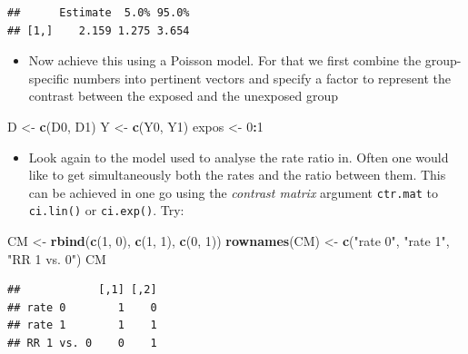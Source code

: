 \documentclass[
]{book}
\newenvironment{Shaded}{\begin{snugshade}}{\end{snugshade}}
\newcommand{\DecValTok}[1]{\textcolor[rgb]{0.00,0.00,0.81}{#1}}
\newcommand{\FunctionTok}[1]{\textcolor[rgb]{0.13,0.29,0.53}{\textbf{#1}}}
\newcommand{\NormalTok}[1]{#1}
\newcommand{\OtherTok}[1]{\textcolor[rgb]{0.56,0.35,0.01}{#1}}
\newcommand{\SpecialCharTok}[1]{\textcolor[rgb]{0.81,0.36,0.00}{\textbf{#1}}}
\newcommand{\StringTok}[1]{\textcolor[rgb]{0.31,0.60,0.02}{#1}}
\providecommand{\tightlist}{%
  \setlength{\itemsep}{0pt}\setlength{\parskip}{0pt}}
\theoremstyle{definition}
\theoremstyle{definition}
\theoremstyle{definition}
\theoremstyle{definition}
\theoremstyle{remark}
\begin{document}
\begin{verbatim}
##      Estimate  5.0% 95.0%
## [1,]    2.159 1.275 3.654
\end{verbatim}

\begin{itemize}
\tightlist
\item
  Now achieve this using a Poisson model. For that we first combine
  the group-specific numbers into pertinent vectors and specify a factor to represent the contrast between the exposed and the unexposed group
\end{itemize}

\begin{Shaded}
\begin{Highlighting}[]
\NormalTok{D }\OtherTok{\textless{}{-}} \FunctionTok{c}\NormalTok{(D0, D1)}
\NormalTok{Y }\OtherTok{\textless{}{-}} \FunctionTok{c}\NormalTok{(Y0, Y1)}
\NormalTok{expos }\OtherTok{\textless{}{-}} \DecValTok{0}\SpecialCharTok{:}\DecValTok{1}
\end{Highlighting}
\end{Shaded}

\begin{itemize}
\tightlist
\item
  Look again to the model used to analyse the rate ratio in. Often one would like to get simultaneously both
  the rates and the ratio between them. This can be achieved in one go
  using the \emph{contrast matrix} argument \texttt{ctr.mat} to
  \texttt{ci.lin()} or \texttt{ci.exp()}. Try:
\end{itemize}

\begin{Shaded}
\begin{Highlighting}[]
\NormalTok{CM }\OtherTok{\textless{}{-}} \FunctionTok{rbind}\NormalTok{(}\FunctionTok{c}\NormalTok{(}\DecValTok{1}\NormalTok{, }\DecValTok{0}\NormalTok{), }\FunctionTok{c}\NormalTok{(}\DecValTok{1}\NormalTok{, }\DecValTok{1}\NormalTok{), }\FunctionTok{c}\NormalTok{(}\DecValTok{0}\NormalTok{, }\DecValTok{1}\NormalTok{))}
\FunctionTok{rownames}\NormalTok{(CM) }\OtherTok{\textless{}{-}} \FunctionTok{c}\NormalTok{(}\StringTok{"rate 0"}\NormalTok{, }\StringTok{"rate 1"}\NormalTok{, }\StringTok{"RR 1 vs. 0"}\NormalTok{)}
\NormalTok{CM}
\end{Highlighting}
\end{Shaded}

\begin{verbatim}
##            [,1] [,2]
## rate 0        1    0
## rate 1        1    1
## RR 1 vs. 0    0    1
\end{verbatim}
\end{document}
